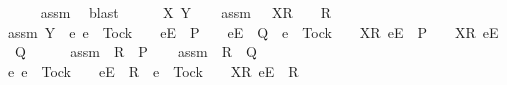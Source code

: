 \begin{isabellebody}
\ \ \ \ \isamarkupfalse%
\ assm{}\ \isamarkupfalse%
\ blast\isanewline
{}\isamarkupfalse%
\isanewline
\ \ \isamarkupfalse%
\ {\isasymrho}\ {\isasymsigma}\ X\ Y\isanewline
\ \ \isamarkupfalse%
\ assm{}{\isacharcolon}\ {\isachardoublequoteopen}{\isasymrho}\ {\isacharat}\ {\isacharbrackleft}X{\isacharbrackright}\isactrlsub R\ {\isacharhash}\ {\isasymsigma}\ {\isasymin}\ R{\isachardoublequoteclose}\isanewline
\ \ \isamarkupfalse%
\ assm{}{\isacharcolon}\ {\isachardoublequoteopen}Y\ {\isasyminter}\ {\isacharbraceleft}e{\isachardot}\ e\ {\isasymnoteq}\ Tock\ {\isasymand}\ {\isasymrho}\ {\isacharat}\ {\isacharbrackleft}{\isacharbrackleft}e{\isacharbrackright}\isactrlsub E{\isacharbrackright}\ {\isasymin}\ P\ {\isasymand}\ {\isasymrho}\ {\isacharat}\ {\isacharbrackleft}{\isacharbrackleft}e{\isacharbrackright}\isactrlsub E{\isacharbrackright}\ {\isasymin}\ Q\ {\isasymor}\ e\ {\isacharequal}\ Tock\ {\isasymand}\ {\isasymrho}\ {\isacharat}\ {\isacharbrackleft}{\isacharbrackleft}X{\isacharbrackright}\isactrlsub R{\isacharcomma}\ {\isacharbrackleft}e{\isacharbrackright}\isactrlsub E{\isacharbrackright}\ {\isasymin}\ P\ {\isasymand}\ {\isasymrho}\ {\isacharat}\ {\isacharbrackleft}{\isacharbrackleft}X{\isacharbrackright}\isactrlsub R{\isacharcomma}\ {\isacharbrackleft}e{\isacharbrackright}\isactrlsub E{\isacharbrackright}\ {\isasymin}\ Q{\isacharbraceright}\ {\isacharequal}\ {\isacharbraceleft}{\isacharbraceright}{\isachardoublequoteclose}\isanewline
\ \ \isamarkupfalse%
\ assm{}{\isacharcolon}\ {\isachardoublequoteopen}\ R\ {\isasymsubseteq}\ P{\isachardoublequoteclose}\isanewline
\ \ \isamarkupfalse%
\ assm{}{\isacharcolon}\ {\isachardoublequoteopen}\ R\ {\isasymsubseteq}\ Q{\isachardoublequoteclose}\isanewline
\ \ \isamarkupfalse%
\ {\isachardoublequoteopen}{\isacharbraceleft}e{\isachardot}\ e\ {\isasymnoteq}\ Tock\ {\isasymand}\ {\isasymrho}\ {\isacharat}\ {\isacharbrackleft}{\isacharbrackleft}e{\isacharbrackright}\isactrlsub E{\isacharbrackright}\ {\isasymin}\ R\ {\isasymor}\ e\ {\isacharequal}\ Tock\ {\isasymand}\ {\isasymrho}\ {\isacharat}\ {\isacharbrackleft}{\isacharbrackleft}X{\isacharbrackright}\isactrlsub R{\isacharcomma}\ {\isacharbrackleft}e{\isacharbrackright}\isactrlsub E{\isacharbrackright}\ {\isasymin}\ R{\isacharbraceright}\isanewline

\end{isabellebody}
